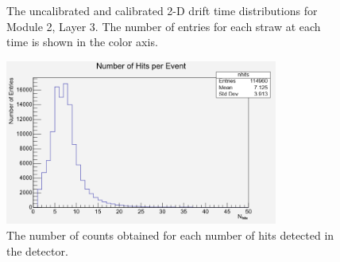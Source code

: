 \documentclass[a4paper]{report}
\numberwithin{equation}{section}
\begin{document}
\begin{figure}[htb!]
	\centering
	\quad
	\centering
	\caption{The uncalibrated and calibrated 2-D drift time 
	distributions for Module 2, Layer 3. The number of entries for each straw at each time is shown in the 
	color axis.}
	\label{fig:calib_drift2d_m2l3}
\end{figure}

\begin{figure}[htb!]
	\centering
	\includegraphics[width=0.8\textwidth]{nhits.png}
	\caption{The number of counts obtained for each number of hits detected in the detector. }
	\label{fig:nhits}
\end{figure} \par
\end{document}
